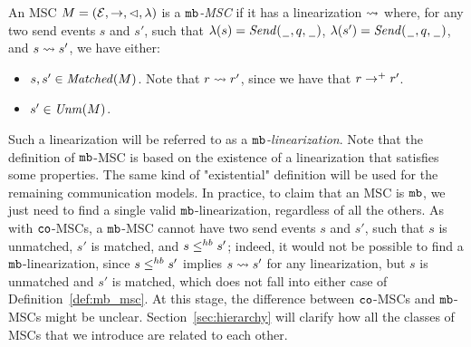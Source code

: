 \begin{definition}\label{def:mb_msc}
	An MSC $M = (\mathcal{E},\to,\lhd,\lambda)$ is a \emph{$\mathtt{mb}$-MSC} if it has a linearization $\rightsquigarrow$ where, for any two send events $s$ and $s'$, such that $\lambda(s)={\mathit{Send}(\hspace{0.1em}\underline{\hspace{0.5em}}\hspace{0.1em},q,\hspace{0.1em}\underline{\hspace{0.5em}}\hspace{0.1em})}$, $\lambda(s')={\mathit{Send}(\hspace{0.1em}\underline{\hspace{0.5em}}\hspace{0.1em},q,\hspace{0.1em}\underline{\hspace{0.5em}}\hspace{0.1em})}$, and $s \rightsquigarrow s'$, we have either:
	\begin{itemize}%
		\item $s,s' \in \mathit{Matched}(M)$. Note that $r \rightsquigarrow r'$, since we have that $r \to^+ r'$.
		\item $s' \in \mathit{Unm}(M)$.
	\end{itemize}
\end{definition}

Such a linearization will be referred to as a \emph{$\mathtt{mb}$-linearization}. Note that the definition of $\mathtt{mb}$-MSC is based on the existence of a linearization that satisfies some properties. The same kind of "existential" definition will be used for the remaining communication models. In practice, to claim that an MSC is $\mathtt{mb}$, we just need to find a single valid $\mathtt{mb}$-linearization, regardless of all the others. As with $\mathtt{co}$-MSCs, a $\mathtt{mb}$-MSC cannot have two send events $s$ and $s'$, such that $s$ is unmatched, $s'$ is matched, and $s \leq^{hb} s'$; indeed, it would not be possible to find a $\mathtt{mb}$-linearization, since $s \leq^{hb} s'$ implies $s \rightsquigarrow s'$ for any linearization, but $s$ is unmatched and $s'$ is matched, which does not fall into either case of Definition~\ref{def:mb_msc}. At this stage, the difference between $\mathtt{co}$-MSCs and $\mathtt{mb}$-MSCs might be unclear. Section~\ref{sec:hierarchy} will clarify how all the classes of MSCs that we introduce are related to each other.


